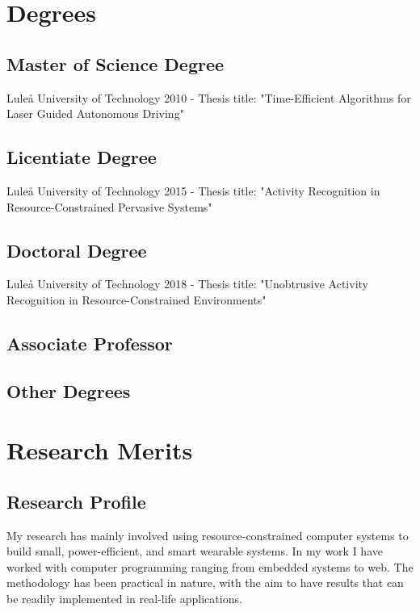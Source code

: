 \documentclass{article}
\begin{document}
\newpage

\section{Degrees}
\subsection{Master of Science Degree}
Luleå University of Technology 2010 - Thesis title: "Time-Efficient Algorithms for Laser Guided Autonomous Driving" \\
\subsection{Licentiate Degree}
Luleå University of Technology 2015 - Thesis title: "Activity Recognition in Resource-Constrained Pervasive Systems" \\

\subsection{Doctoral Degree}
Luleå University of Technology 2018 - Thesis title: "Unobtrusive Activity Recognition in Resource-Constrained Environments" \\

\subsection{Associate Professor}

\subsection{Other Degrees}
\newpage

\section{Research Merits}
\subsection{Research Profile}
My research has mainly involved using resource-constrained computer systems to build small, power-efficient, and smart wearable systems. In my work I have worked with computer programming ranging from embedded systems to web. The methodology has been practical in nature, with the aim to have results that can be readily implemented in real-life applications.
\end{document}
